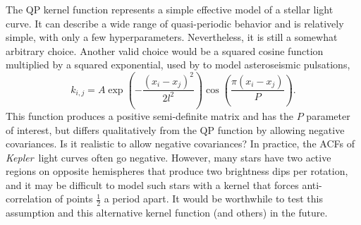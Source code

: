 \documentclass[a4paper,fleqn,usenatbib,useAMS]{mnras}
\newcommand{\Kepler}{{\it Kepler}}
\begin{document}
The QP kernel function represents a simple effective model of a stellar
light curve.
It can describe a wide range of quasi-periodic behavior and is
relatively simple, with only a few hyperparameters.
Nevertheless, it is still a somewhat arbitrary choice.
Another valid choice would be a squared cosine function multiplied by a
squared exponential, used by \citet{Brewer2009} to model asteroseismic
pulsations,
\begin{equation}
k_{i,j} = A \exp \left(-\frac{(x_i - x_j)^2}{2l^2}\right)
\cos\left(\frac{\pi(x_i - x_j)}{P}\right).
\end{equation}
\label{eq:cos_kernel}
This function produces a positive semi-definite matrix and has the $P$
parameter of interest, but differs qualitatively from the QP function
by allowing negative covariances.
Is it realistic to allow negative covariances?
In practice, the ACFs of \Kepler\ light curves often go negative.
However, many stars have two active regions on opposite hemispheres that
produce two brightness dips per rotation, and it
may be difficult to model such stars with a kernel that forces
anti-correlation of points $\frac{1}{2}$ a period apart.
It would be worthwhile to test this assumption and this alternative
kernel function (and others) in the future.
\end{document}
